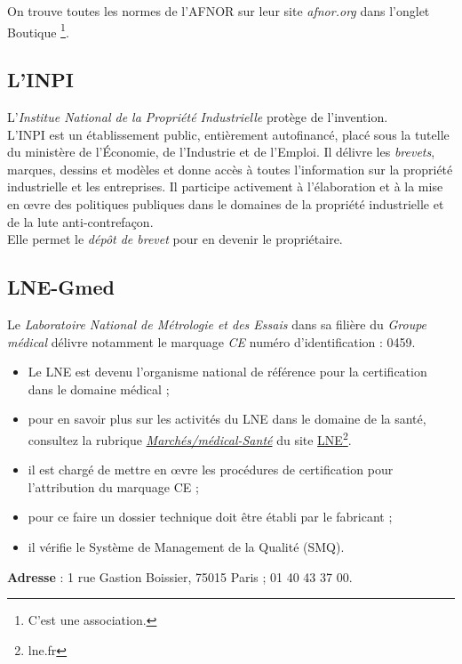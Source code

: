 \documentclass[a4paper,11pt]{article}
\begin{document}
\begin{sloppypar}
On trouve toutes les normes de l'AFNOR sur leur site \emph{afnor.org} dans l'onglet \og Boutique \fg\footnote{C'est une association.}.

\subsection{L'INPI}
L'\emph{Institue National de la Propriété Industrielle} protège de l'invention.\\

L'INPI est un établissement public, entièrement autofinancé, placé sous la tutelle du ministère de l'\'Economie, de l'Industrie et de l'Emploi.
Il délivre les \emph{brevets}, marques, dessins et modèles et donne accès à toutes l'information sur la propriété industrielle et les entreprises.
Il participe activement à l'élaboration et à la mise en \oe vre des politiques publiques dans le domaines de la propriété industrielle et de la lute anti-contrefaçon.\\

Elle permet le \emph{dépôt de brevet} pour en devenir le propriétaire.

\subsection{LNE-Gmed}
Le \emph{Laboratoire National de Métrologie et des Essais} dans sa filière du \emph{Groupe médical} délivre notamment le marquage \emph{CE} numéro d'identification : 0459.

\begin{itemize}
 \item Le LNE est devenu l'organisme national de référence pour la certification dans le domaine médical ;
 \item pour en savoir plus sur les activités du LNE dans le domaine de la santé, consultez la rubrique \underline{\emph{Marchés/médical-Santé}} du site \href{https:www.lne.fr}{LNE}\footnote{lne.fr}.
 \item il est chargé de mettre en \oe vre les procédures de certification pour l'attribution du marquage CE ;
 \item pour ce faire un dossier technique doit être établi par le fabricant ;
 \item il vérifie le Système de Management de la Qualité (SMQ).
\end{itemize}

\vspace{1.5ex}
\textbf{Adresse} : 1 rue Gastion Boissier, 75015 Paris ; 01 40 43 37 00.\\


\end{sloppypar}
\end{document}
